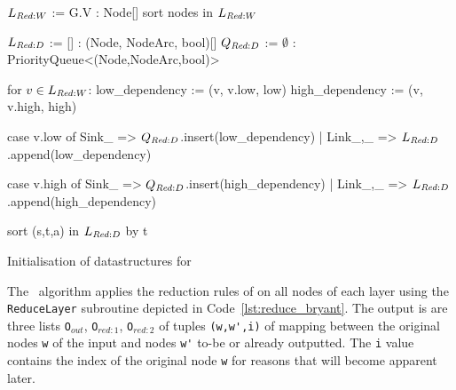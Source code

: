 \begin{lstfloat}[ht!]
  \centering

  \begin{blstlisting}
  $\ReduceLwork$ := G.V : Node[]
  sort nodes in $\ReduceLwork$

  $\ReduceLdep$ := [] : (Node, NodeArc, bool)[]
  $\ReduceQdep$ := $\emptyset$ : PriorityQueue<(Node,NodeArc,bool)>

  for $v \in \ReduceLwork$:
      low_dependency := (v, v.low, low)
      high_dependency := (v, v.high, high)

      case v.low of Sink{_}   => $\ReduceQdep$.insert(low_dependency)
                  | Link{_,_} => $\ReduceLdep$.append(low_dependency)

      case v.high of Sink{_}   => $\ReduceQdep$.insert(high_dependency)
                   | Link{_,_} => $\ReduceLdep$.append(high_dependency)

  sort (s,t,a) in $\ReduceLdep$ by t
  \end{blstlisting}

  \caption{Initialisation of datastructures for \Reduce}
  \label{lst:reduce_init}
\end{lstfloat}

The \Reduce\ algorithm applies the reduction rules of \textcite{Bryant86} on all
nodes of each layer using the \lstinline{ReduceLayer} subroutine depicted in
Code~\ref{lst:reduce_bryant}. The output is are three lists
\lstinline{O}$_{\mathit{out}}$, \lstinline{O}$_{\mathit{red:}1}$,
\lstinline{O}$_{\mathit{red:}2}$ of tuples \lstinline{(w,w',i)} of mapping
between the original nodes \lstinline{w} of the input and nodes \lstinline{w'}
to-be or already outputted. The \lstinline{i} value contains the index of the
original node \lstinline{w} for reasons that will become apparent later.

